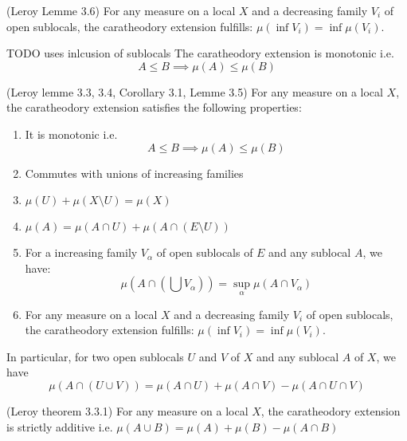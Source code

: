 \begin{lemma}
(Leroy Lemme 3.6)
    \label{lem:commutes_with_inf_opens}
    For any measure on a local $X$ and a decreasing family $V_i$ of open sublocals, the caratheodory extension fulfills: $\mu (\inf V_i) = \inf \mu(V_i)$.
\end{lemma}

\begin{lemma}
    \label{lem:monotonic}
     TODO uses inlcusion of sublocals
    The caratheodory extension is monotonic i.e. \[A \le B \implies \mu (A) \le \mu (B)\]
\end{lemma}

\begin{proposition}
(Leroy lemme 3.3, 3.4, Corollary 3.1, Lemme 3.5)
    \label{prop:elementary_properties_of_caratheodory_extensions}
    For any measure on a local $X$, the caratheodory extension satisfies the following properties:
    \begin{enumerate}
        \item It is monotonic i.e. \[A \le B \implies \mu (A) \le \mu (B)\]
        \item Commutes with unions of increasing families
        \item $\mu(U) + \mu(X \setminus U) = \mu(X)$
        \item $\mu(A) = \mu(A \cap U) + \mu(A \cap(E\setminus U))$
        \item For a increasing family $V_{\alpha}$ of open sublocals of $E$ and any sublocal $A$, we have:
        \[\mu(A \cap(\bigcup V_{\alpha})) = \sup_\alpha \mu(A\cap V_\alpha)\]
        \item For any measure on a local $X$ and a decreasing family $V_i$ of open sublocals, the caratheodory extension fulfills: $\mu (\inf V_i) = \inf \mu(V_i)$.
    \end{enumerate}
    In particular, for two open sublocals $U$ and $V$ of $X$ and any sublocal $A$ of $X$, we have
    \[\mu(A \cap (U \cup V)) = \mu(A\cap U) + \mu(A\cap V) - \mu(A \cap U \cap V)\]
\end{proposition}



\begin{proposition}
(Leroy theorem 3.3.1)
    \label{prop:strictly_additive}
    For any measure on a local $X$, the caratheodory extension is
    strictly additive i.e. $\mu (A \cup B) = \mu(A) + \mu(B) - \mu(A \cap B)$
\end{proposition}



